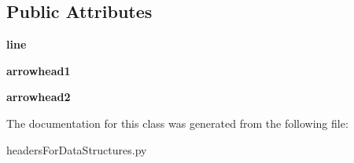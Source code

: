 \subsection*{Public Attributes}
\begin{DoxyCompactItemize}
\item 
{\bfseries line}\hypertarget{classheaders_for_data_structures_1_1right_arrow_aee6de10c02c9ea41f85dda3608bc2c29}{}\label{classheaders_for_data_structures_1_1right_arrow_aee6de10c02c9ea41f85dda3608bc2c29}

\item 
{\bfseries arrowhead1}\hypertarget{classheaders_for_data_structures_1_1right_arrow_a8d9040aee6f54367b956a1af7aec6401}{}\label{classheaders_for_data_structures_1_1right_arrow_a8d9040aee6f54367b956a1af7aec6401}

\item 
{\bfseries arrowhead2}\hypertarget{classheaders_for_data_structures_1_1right_arrow_a057c3637cb94f18827aa4ffa86dd3355}{}\label{classheaders_for_data_structures_1_1right_arrow_a057c3637cb94f18827aa4ffa86dd3355}

\end{DoxyCompactItemize}


The documentation for this class was generated from the following file\+:\begin{DoxyCompactItemize}
\item 
headers\+For\+Data\+Structures.\+py\end{DoxyCompactItemize}
